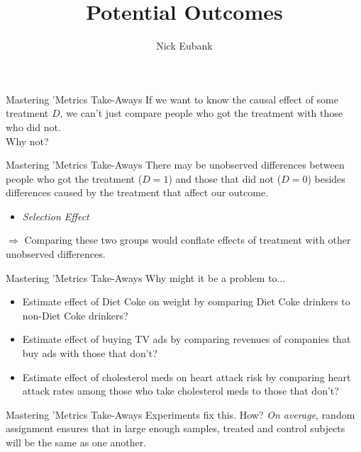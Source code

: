 \documentclass[11pt,handout]{beamer}
\title{Potential Outcomes}
\author{\small Nick Eubank}
\date{\vspace*{.3in} \date}
\begin{document}
\begin{frame}[c]
\maketitle
\end{frame}

\begin{frame}[c]{Mastering 'Metrics Take-Aways}
  If we want to know the causal effect of some treatment $D$, \alert{we can't just compare people who got the treatment with those who did not.} \\
  \pause
  \vspace*{0.5cm}
  Why not?
\end{frame}

\begin{frame}[c]{Mastering 'Metrics Take-Aways}
There may be \alert{unobserved differences} between people who got the treatment ($D=1$) and those that did not ($D=0$) besides differences caused by the treatment \alert{that affect our outcome}.
\begin{itemize}
  \pause \item \emph{Selection Effect}
\end{itemize}
\pause $\Rightarrow$ Comparing these two groups would conflate effects of treatment with other unobserved differences.
\end{frame}


\begin{frame}[c]{Mastering 'Metrics Take-Aways}
Why might it be a problem to...
\begin{itemize}
  \pause \item Estimate effect of Diet Coke on weight by comparing Diet Coke drinkers to non-Diet Coke drinkers?
  \pause \item Estimate effect of buying TV ads by comparing revenues of companies that buy ads with those that don't?
  \pause \item Estimate effect of cholesterol meds on heart attack risk by comparing heart attack rates among those who take cholesterol meds to those that don't?
\end{itemize}
\end{frame}


\begin{frame}[c]{Mastering 'Metrics Take-Aways}
Experiments fix this. How?
\vspace{1cm}
\pause
\emph{On average}, random assignment ensures that in large enough samples, treated and control subjects will be the same as one another.
\end{frame}
\end{document}
